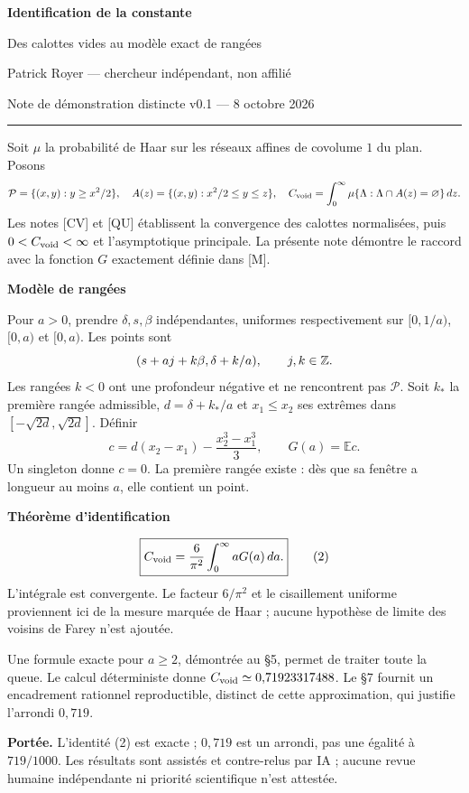 \documentclass[11pt,a4paper]{article}
\newcommand{\E}{\mathbb E}\newcommand{\Prb}{\mathbb P}
\newcommand{\head}[1]{\vspace{3pt}{\large\bfseries\color{navy}#1}\par}
\newcommand{\subhead}[1]{{\bfseries\color{navy}#1}\par}
\begin{document}
{\LARGE\bfseries\color{navy}Identification de la constante}\par
{\large Des calottes vides au modèle exact de rangées}\par
Patrick Royer --- chercheur indépendant, non affilié\par
Note de démonstration distincte v0.1 --- 8 octobre 2026\par
\vspace{3pt}\hrule\vspace{6pt}

\head{1. Résultat et conventions}
Soit $\mu$ la probabilité de Haar sur les réseaux affines de covolume $1$ du plan. Posons
\[
 \mathcal P=\{(x,y):y\ge x^2/2\},\quad
 A(z)=\{(x,y):x^2/2\le y\le z\},\quad
 C_{\rm void}=\int_0^\infty\mu\{\Lambda:\Lambda\cap A(z)=\varnothing\}\,dz.
\]
Les notes [CV] et [QU] établissent la convergence des calottes normalisées, puis $0<C_{\rm void}<\infty$ et l'asymptotique principale. La présente note démontre le raccord avec la fonction $G$ exactement définie dans [M].

\subhead{Modèle de rangées}
Pour $a>0$, prendre $\delta,s,\beta$ indépendantes, uniformes respectivement sur $[0,1/a)$, $[0,a)$ et $[0,a)$. Les points sont
\[
 (s+aj+k\beta,\delta+k/a),\qquad j,k\in\mathbb Z.
\]
Les rangées $k<0$ ont une profondeur négative et ne rencontrent pas $\mathcal P$. Soit $k_*$ la première rangée admissible, $d=\delta+k_*/a$ et $x_1\le x_2$ ses extrêmes dans $[-\sqrt{2d},\sqrt{2d}]$. Définir
\[
 c=d(x_2-x_1)-\frac{x_2^3-x_1^3}{3},\qquad G(a)=\E c.
 \tag{1}
\]
Un singleton donne $c=0$. La première rangée existe : dès que sa fenêtre a longueur au moins $a$, elle contient un point.

\subhead{Théorème d'identification}
\[
 \boxed{C_{\rm void}=\frac6{\pi^2}\int_0^\infty aG(a)\,da.}
 \tag{2}
\]
L'intégrale est convergente. Le facteur $6/\pi^2$ et le cisaillement uniforme proviennent ici de la mesure marquée de Haar ; aucune hypothèse de limite des voisins de Farey n'est ajoutée.

Une formule exacte pour $a\ge2$, démontrée au §5, permet de traiter toute la queue. Le calcul déterministe donne $C_{\rm void}\simeq0{,}71923317488$. Le §7 fournit un encadrement rationnel reproductible, distinct de cette approximation, qui justifie l'arrondi $0{,}719$.

\textbf{Portée.} L'identité (2) est exacte ; $0{,}719$ est un arrondi, pas une égalité à $719/1000$. Les résultats sont assistés et contre-relus par IA ; aucune revue humaine indépendante ni priorité scientifique n'est attestée.
\end{document}
